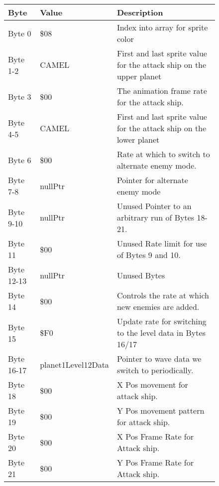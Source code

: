 \begin{figure}[H]
{\begin{adjustbox}{width=12cm}
\begin{tabular}{lll}
\toprule
 Byte       & Value                      & Description                                                         \\
\midrule
 Byte 0     & \$08                        & Index into array for sprite color                                   \\
 Byte 1-2   & CAMEL                      & First and last sprite value for the attack ship on the upper planet \\
 Byte 3     & \$00                        & The animation frame rate for the attack ship.                       \\
 Byte 4-5   & CAMEL                      & First and last sprite value for the attack ship on the lower planet \\
 Byte 6     & \$00                        & Rate at which to switch to alternate enemy mode.                    \\
 Byte 7-8   & nullPtr                    & Pointer for alternate enemy mode                                    \\
 Byte 9-10  & nullPtr                    & Unused Pointer to an arbitrary run of Bytes 18-21.                  \\
 Byte 11    & \$00                        & Unused Rate limit for use of Bytes 9 and 10.                        \\
 Byte 12-13 & nullPtr                    & Unused Bytes                                                        \\
 Byte 14    & \$00                        & Controls the rate at which new enemies are added.                   \\
 Byte 15    & \$F0                        & Update rate for switching to the level data in Bytes 16/17          \\
 Byte 16-17 & planet1Level12Data         & Pointer to wave data we switch to periodically.                     \\
 Byte 18    & \$00                        & X Pos movement for attack ship.                                     \\
 Byte 19    & \$00                        & Y Pos movement pattern for attack ship.                             \\
 Byte 20    & \$00                        & X Pos Frame Rate for Attack ship.                                   \\
 Byte 21    & \$00                        & Y Pos Frame Rate for Attack ship.                                   \\

\end{tabular}
\end{adjustbox}}
\end{figure}
